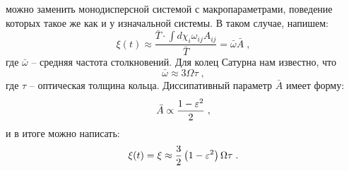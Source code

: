 можно заменить монодисперсной системой с макропараметрами, поведение которых такое же как и у изначальной системы.
В таком случае, напишем:
\begin{equation}
  \xi(t)\approx\frac{\bar{T}\cdot\int d\chi_i\omega_{ij}A_{ij}}{\bar{T}}=\bar{\omega}\bar{A}\;,
\end{equation}
где $\bar{\omega}$ -- средняя частота столкновений. Для колец Сатурна нам известно, что 
\begin{equation}
  \bar{\omega}\approx3\Omega\tau\;,
\end{equation}
где $\tau$ -- оптическая толщина кольца. Диссипативный параметр $\bar{A}$ имеет форму:
\begin{equation}
  \bar{A}\propto\frac{1-\varepsilon^2}{2}\;,
\end{equation}
и в итоге можно написать:
\begin{equation}
  \xi(t)=\xi\approx\frac{3}{2}\left(1-\varepsilon^2\right)\Omega\tau\;.
\end{equation}